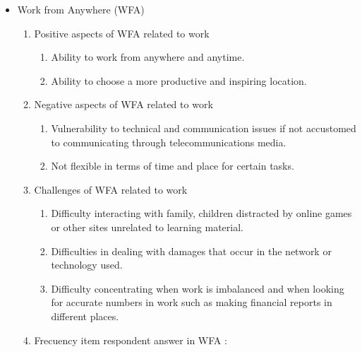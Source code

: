 \documentclass[conference]{IEEEtran}
\begin{document}
\begin{itemize}
\begin{enumerate}
\end{enumerate}
\item {Work from Anywhere (WFA)}
\begin{enumerate}
\item {Positive aspects of WFA related to work}
\begin{enumerate}
\item Ability to work from anywhere and anytime.
\item Ability to choose a more productive and inspiring location.


\end{enumerate}
\item {Negative aspects of WFA related to work}
\begin{enumerate}
\item Vulnerability to technical and communication issues if not accustomed to communicating through telecommunications media.
\item Not flexible in terms of time and place for certain tasks.
\end{enumerate}
\item Challenges of WFA related to work
\begin{enumerate}
\item Difficulty interacting with family, children distracted by online games or other sites unrelated to learning material.
\item Difficulties in dealing with damages that occur in the network or technology used.
\item Difficulty concentrating when work is imbalanced and when looking for accurate numbers in work such as making financial reports in different places.
\end{enumerate}
\item Frecuency item respondent answer in WFA :


 \label{tab:title} 
\begin{table}[h]


\end{table}
\end{enumerate}
\end{itemize}
\end{document}

